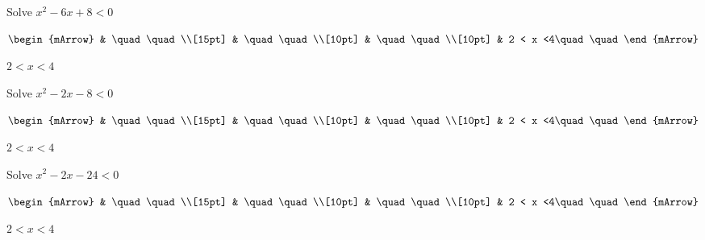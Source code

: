 \begin{mtask}[resume]
\begin{exercise}
         \end{exercise}
   \task \begin{exercise} Solve $x^2 - 6x +8 < 0$
           \begin{envSolution}
             $\begin{mArrow} 
			       & \quad \quad              \\[15pt]
                   & \quad \quad              \\[10pt]
		   		   & \quad \quad              \\[10pt]
				   & 2 < x <4\quad \quad 
              \end{mArrow}$
            \begin{shortsolution}  
			     $2 < x <4$
			\end{shortsolution}				 
           \end{envSolution}
         \end{exercise}
   \task \begin{exercise} Solve $x^2 - 2x -8 < 0$
           \begin{envSolution}
             $\begin{mArrow} 
			       & \quad \quad              \\[15pt]
                   & \quad \quad              \\[10pt]
		   		   & \quad \quad              \\[10pt]
				   & 2 < x <4\quad \quad 
              \end{mArrow}$
            \begin{shortsolution}  
			     $2 < x <4$
			\end{shortsolution}				 
           \end{envSolution}
         \end{exercise}
   \task \begin{exercise} Solve $x^2 - 2x -24 < 0$
           \begin{envSolution}
             $\begin{mArrow} 
			       & \quad \quad              \\[15pt]
                   & \quad \quad              \\[10pt]
		   		   & \quad \quad              \\[10pt]
				   & 2 < x <4\quad \quad 
              \end{mArrow}$
            \begin{shortsolution}  
			     $2 < x <4$
			\end{shortsolution}				 

\end{envSolution}
\end{exercise}
\end{mtask}
